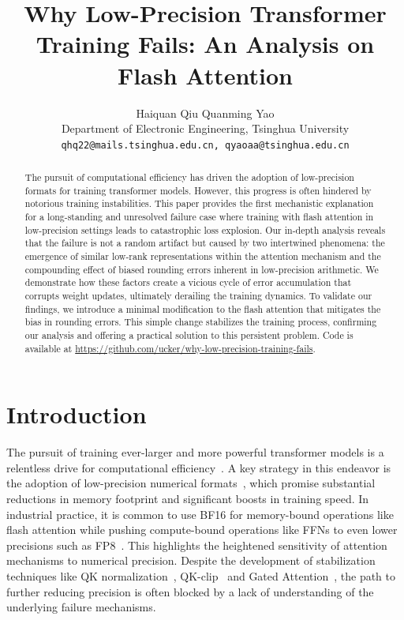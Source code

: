 \documentclass{article} %
\title{Why Low-Precision Transformer Training Fails: An Analysis on Flash Attention}
\author{Haiquan Qiu  \quad Quanming Yao \\
Department of Electronic Engineering, Tsinghua University\\
\texttt{qhq22@mails.tsinghua.edu.cn, qyaoaa@tsinghua.edu.cn}
}
\begin{document}
\maketitle

\begin{abstract}
The pursuit of computational efficiency has driven the adoption of low-precision formats for training transformer models. However, this progress is often hindered by notorious training instabilities. This paper provides the first mechanistic explanation for a long-standing and unresolved failure case where training with flash attention in low-precision settings leads to catastrophic loss explosion. Our in-depth analysis reveals that the failure is not a random artifact but caused by two intertwined phenomena: the emergence of similar low-rank representations within the attention mechanism and the compounding effect of biased rounding errors inherent in low-precision arithmetic. We demonstrate how these factors create a vicious cycle of error accumulation that corrupts weight updates, ultimately derailing the training dynamics. To validate our findings, we introduce a minimal modification to the flash attention that mitigates the bias in rounding errors. This simple change stabilizes the training process, confirming our analysis and offering a practical solution to this persistent problem. Code is available at \url{https://github.com/ucker/why-low-precision-training-fails}.
\end{abstract}


\section{Introduction}



The pursuit of training ever-larger and more powerful transformer models is a relentless drive for computational efficiency~\citep{brown2020language,hoffmann2022training}. A key strategy in this endeavor is the adoption of low-precision numerical formats~\citep{micikevicius2017mixed,wang2018training,kalamkar2019study,liu2024deepseek}, which promise substantial reductions in memory footprint and significant boosts in training speed. In industrial practice, it is common to use BF16 for memory-bound operations like flash attention while pushing compute-bound operations like FFNs to even lower precisions such as FP8~\citep{liu2024deepseek,qwen3technicalreport}. This highlights the heightened sensitivity of attention mechanisms to numerical precision. Despite the development of stabilization techniques like QK normalization~\citep{henry2020query,qwen3technicalreport}, QK-clip~\citep{team2025kimi} and Gated Attention~\citep{qiu2025gated,qwen3technicalreport}, the path to further reducing precision is often blocked by a lack of understanding of the underlying failure mechanisms.
\end{document}
